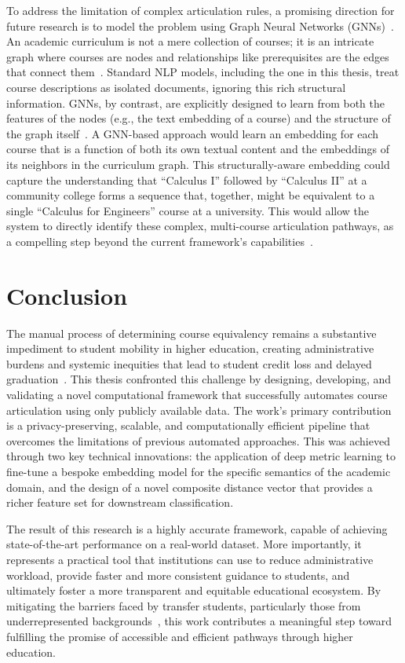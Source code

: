 To address the limitation of complex articulation rules, a promising direction for future research is to model the problem using Graph Neural Networks (GNNs)~\cite{kipf2017semisupervisedclassificationgraphconvolutional, hamilton2018inductiverepresentationlearninglarge}. An academic curriculum is not a mere collection of courses; it is an intricate graph where courses are nodes and relationships like prerequisites are the edges that connect them~\cite{zhang2023curriculum, wang2025generativecontrastiveheterogeneousgraphneural}. Standard NLP models, including the one in this thesis, treat course descriptions as isolated documents, ignoring this rich structural information. GNNs, by contrast, are explicitly designed to learn from both the features of the nodes (e.g., the text embedding of a course) and the structure of the graph itself~\cite{veličković2018graphattentionnetworks, s23084168}. A GNN-based approach would learn an embedding for each course that is a function of both its own textual content and the embeddings of its neighbors in the curriculum graph. This structurally-aware embedding could capture the understanding that ``Calculus I'' followed by ``Calculus II'' at a community college forms a sequence that, together, might be equivalent to a single ``Calculus for Engineers'' course at a university. This would allow the system to directly identify these complex, multi-course articulation pathways, as a compelling step beyond the current framework's capabilities~\cite{Yan_2024, zhang2023curriculum}.

\section{Conclusion}\label{ch:5.4}
The manual process of determining course equivalency remains a substantive impediment to student mobility in higher education, creating administrative burdens and systemic inequities that lead to student credit loss and delayed graduation~\cite{gao2017, collegeopportunity2017}. This thesis confronted this challenge by designing, developing, and validating a novel computational framework that successfully automates course articulation using only publicly available data. The work's primary contribution is a privacy-preserving, scalable, and computationally efficient pipeline that overcomes the limitations of previous automated approaches. This was achieved through two key technical innovations: the application of deep metric learning to fine-tune a bespoke embedding model for the specific semantics of the academic domain, and the design of a novel composite distance vector that provides a richer feature set for downstream classification.

The result of this research is a highly accurate framework, capable of achieving state-of-the-art performance on a real-world dataset. More importantly, it represents a practical tool that institutions can use to reduce administrative workload, provide faster and more consistent guidance to students, and ultimately foster a more transparent and equitable educational ecosystem. By mitigating the barriers faced by transfer students, particularly those from underrepresented backgrounds~\cite{ace2025}, this work contributes a meaningful step toward fulfilling the promise of accessible and efficient pathways through higher education.